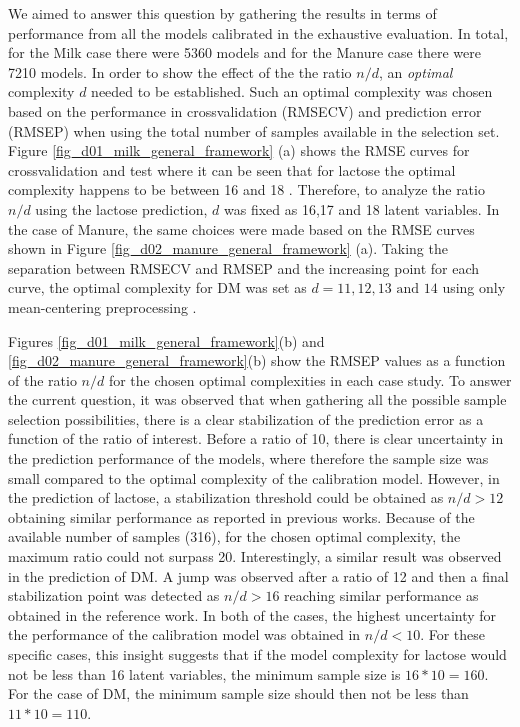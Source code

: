 \documentclass[journal=ancham,manuscript=article]{achemso}
\begin{document}
We aimed to answer this question by gathering the results in terms of performance from all the models calibrated in the exhaustive evaluation. In total, for the Milk case there were 5360 models and for the Manure case there were 7210 models. In order to show the effect of the the ratio $n/d$, an \emph{optimal} complexity $d$ needed to be established. Such an optimal complexity was chosen based on the performance in crossvalidation (RMSECV) and prediction error (RMSEP) when using the total number of samples available in the selection set. Figure \ref{fig_d01_milk_general_framework} (a) shows the RMSE curves for crossvalidation and test where it can be seen that for lactose the optimal complexity happens to be between 16 and 18 \cite{Diaz-Olivares2020}. Therefore, to analyze the ratio $n/d$ using the lactose prediction, $d$ was fixed as 16,17 and 18 latent variables. In the case of Manure, the same choices were made based on the RMSE curves shown in Figure \ref{fig_d02_manure_general_framework} (a). Taking the separation between RMSECV and RMSEP and the increasing point for each curve, the optimal complexity for DM was set as $d = 11,12,13 \text{ and } 14$ using only mean-centering preprocessing \cite{Saeys2005}. 

Figures \ref{fig_d01_milk_general_framework}(b) and \ref{fig_d02_manure_general_framework}(b) show the RMSEP values as a function of the ratio $n/d$ for the chosen optimal complexities in each case study. To answer the current question, it was observed that when gathering all the possible sample selection possibilities, there is a clear stabilization of the prediction error as a function of the ratio of interest. Before a ratio of 10, there is clear uncertainty in the prediction performance of the models, where therefore the sample size was small compared to the optimal complexity of the calibration model. However, in the prediction of lactose, a stabilization threshold could be obtained as $n/d>12$ obtaining similar performance as reported in previous works\cite{Diaz-Olivares2020, Aernouts2011}. Because of the available number of samples (316), for the chosen optimal complexity, the maximum ratio could not surpass 20. Interestingly, a similar result was observed in the prediction of DM. A jump was observed after a ratio of 12 and then a final stabilization point was detected as $n/d>16$ reaching similar performance as obtained in the reference work\cite{Saeys2005}. In both of the cases, the highest uncertainty for the performance of the calibration model was obtained in $n/d<10$. For these specific cases, this insight suggests that if the model complexity for lactose would not be less than 16 latent variables, the minimum sample size is $16*10=160$. For the case of DM, the minimum sample size should then not be less than $11*10=110$. 
\end{document}
